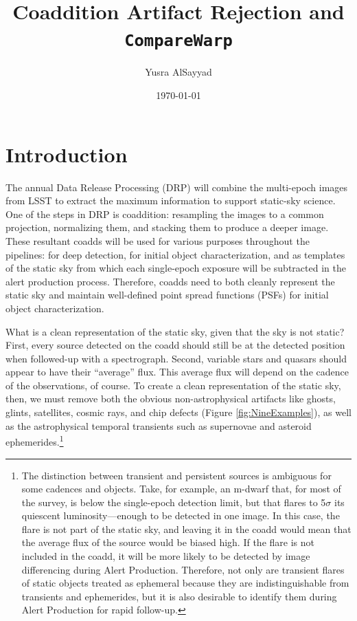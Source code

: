 \documentclass[DM,authoryear,toc]{lsstdoc}
\title{Coaddition Artifact Rejection and \texttt{CompareWarp}}
\author{%
Yusra AlSayyad
}
\date{\today}
\begin{document}
\maketitle


\section{Introduction}
The annual Data Release Processing (DRP) will combine the multi-epoch images from LSST to extract the maximum information to support static-sky science.
One of the steps in DRP is coaddition:  resampling the images to a common projection,  normalizing them, and stacking them to produce a deeper image.
These resultant coadds will be used for various purposes throughout the pipelines: for deep detection, for initial object characterization, and as templates of the static sky from which each single-epoch exposure will be subtracted in the alert production process.
Therefore, coadds need to both cleanly represent the static sky and  maintain well-defined point spread functions (PSFs) for initial object characterization.

What is a clean representation of the static sky, given that the sky is not static?
First, every source detected on the coadd should still be at the detected position when followed-up with a spectrograph.
Second, variable stars and quasars should appear to have their ``average'' flux.
This average flux will depend on the cadence of the observations, of course.
To create a clean representation of the static sky, then, we must remove both the obvious non-astrophysical artifacts like ghosts, glints, satellites, cosmic rays, and chip defects (Figure \ref{fig:NineExamples}),  as well as the astrophysical temporal transients such as supernovae and asteroid ephemerides.\footnote{The distinction between transient and persistent sources is ambiguous for some cadences and objects.
Take, for example, an m-dwarf that, for most of the survey, is below the single-epoch detection limit, but that flares to 5$\sigma$ its quiescent luminosity---enough to be detected in one image.
In this case, the flare is not part of the static sky, and leaving it in the coadd would mean that the average flux of the source would be biased high.
If the flare is not included in the coadd, it will be more likely to be detected by image differencing during Alert Production.
Therefore, not only are transient flares of static objects treated as ephemeral because they are indistinguishable from transients and ephemerides, but it is also desirable to identify them during Alert Production for rapid follow-up.}
\end{document}
